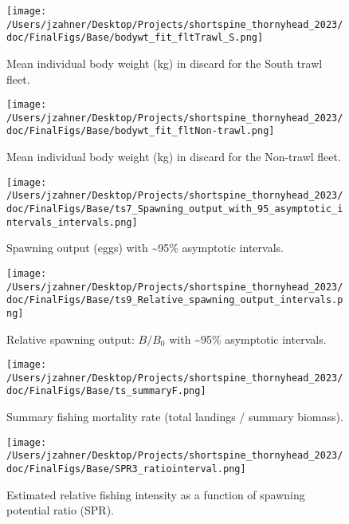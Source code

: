 \documentclass[11pt,
  english,
  letterpaper,
]{article}
\begin{document}
\begin{figure}
\centering
\texttt{[image: /Users/jzahner/Desktop/Projects/shortspine\_thornyhead\_2023/doc/FinalFigs/Base/bodywt\_fit\_fltTrawl\_S.png]}
\caption{Mean individual body weight (kg) in discard for the South trawl fleet.\label{fig:weightSouthTrl}}
\end{figure}

\begin{figure}
\centering
\texttt{[image: /Users/jzahner/Desktop/Projects/shortspine\_thornyhead\_2023/doc/FinalFigs/Base/bodywt\_fit\_fltNon-trawl.png]}
\caption{Mean individual body weight (kg) in discard for the Non-trawl fleet.\label{fig:weightNonTrl}}
\end{figure}

\begin{figure}
\centering
\texttt{[image: /Users/jzahner/Desktop/Projects/shortspine\_thornyhead\_2023/doc/FinalFigs/Base/ts7\_Spawning\_output\_with\_95\_asymptotic\_intervals\_intervals.png]}
\caption{Spawning output (eggs) with \textasciitilde95\% asymptotic intervals.\label{fig:spawnout}}
\end{figure}

\begin{figure}
\centering
\texttt{[image: /Users/jzahner/Desktop/Projects/shortspine\_thornyhead\_2023/doc/FinalFigs/Base/ts9\_Relative\_spawning\_output\_intervals.png]}
\caption{Relative spawning output: \(B/B_0\) with \textasciitilde95\% asymptotic intervals.\label{fig:relspawnout}}
\end{figure}

\begin{figure}
\centering
\texttt{[image: /Users/jzahner/Desktop/Projects/shortspine\_thornyhead\_2023/doc/FinalFigs/Base/ts\_summaryF.png]}
\caption{Summary fishing mortality rate (total landings / summary biomass).\label{fig:summary_f}}
\end{figure}

\begin{figure}
\centering
\texttt{[image: /Users/jzahner/Desktop/Projects/shortspine\_thornyhead\_2023/doc/FinalFigs/Base/SPR3\_ratiointerval.png]}
\caption{Estimated relative fishing intensity as a function of spawning potential ratio (SPR).\label{fig:spr_trajectory}}
\end{figure}
\end{document}
